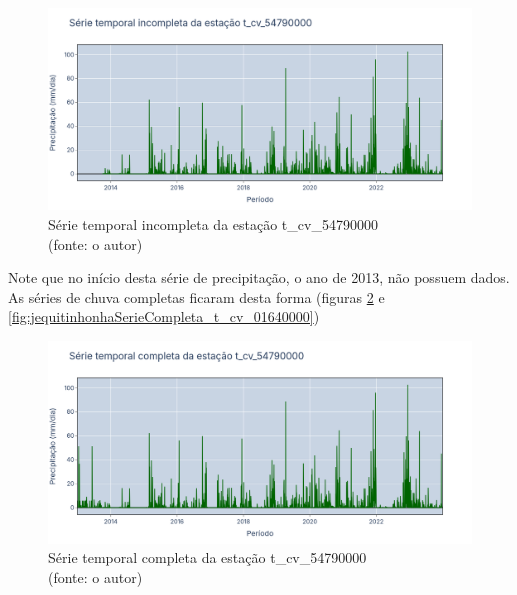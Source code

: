 \begin{figure}[!h]
	\centering
	\includegraphics[scale=0.25]{Figuras/jequiti/jequitinhonhaSerieIncompleta_t_cv_54790000.png}
	\caption{Série temporal incompleta da estação t\_cv\_54790000\\(fonte: o autor)}
	\label{fig:jequitinhonhaSerieIncompleta_t_cv_54790000}
\end{figure}

Note que no início desta série de precipitação, o ano de 2013, não possuem dados. As séries de chuva completas ficaram desta forma (figuras \ref{fig:jequitinhonhaSerieCompleta_t_cv_54790000} e \ref{fig:jequitinhonhaSerieCompleta_t_cv_01640000})

\begin{figure}[!h]
	\centering
	\includegraphics[scale=0.25]{Figuras/jequiti/jequitinhonhaSerieCompleta_t_cv_54790000.png}
	\caption{Série temporal completa da estação t\_cv\_54790000\\(fonte: o autor)}
	\label{fig:jequitinhonhaSerieCompleta_t_cv_54790000}
\end{figure}

